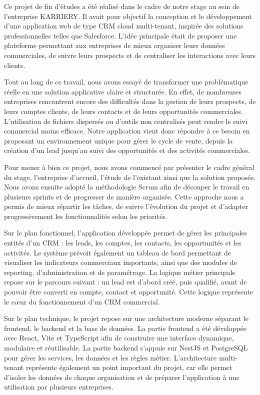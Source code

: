 \documentclass[12pt,a4paper]{report}
\begin{document}
Ce projet de fin d’études a été réalisé dans le cadre de notre stage au sein de l’entreprise KARRIERY. Il avait pour objectif la conception et le développement d’une application web de type CRM cloud multi-tenant, inspirée des solutions professionnelles telles que Salesforce. L’idée principale était de proposer une plateforme permettant aux entreprises de mieux organiser leurs données commerciales, de suivre leurs prospects et de centraliser les interactions avec leurs clients.

Tout au long de ce travail, nous avons essayé de transformer une problématique réelle en une solution applicative claire et structurée. En effet, de nombreuses entreprises rencontrent encore des difficultés dans la gestion de leurs prospects, de leurs comptes clients, de leurs contacts et de leurs opportunités commerciales. L’utilisation de fichiers dispersés ou d’outils non centralisés peut rendre le suivi commercial moins efficace. Notre application vient donc répondre à ce besoin en proposant un environnement unique pour gérer le cycle de vente, depuis la création d’un lead jusqu’au suivi des opportunités et des activités commerciales.

Pour mener à bien ce projet, nous avons commencé par présenter le cadre général du stage, l’entreprise d’accueil, l’étude de l’existant ainsi que la solution proposée. Nous avons ensuite adopté la méthodologie Scrum afin de découper le travail en plusieurs sprints et de progresser de manière organisée. Cette approche nous a permis de mieux répartir les tâches, de suivre l’évolution du projet et d’adapter progressivement les fonctionnalités selon les priorités.

Sur le plan fonctionnel, l’application développée permet de gérer les principales entités d’un CRM : les leads, les comptes, les contacts, les opportunités et les activités. Le système prévoit également un tableau de bord permettant de visualiser les indicateurs commerciaux importants, ainsi que des modules de reporting, d’administration et de paramétrage. La logique métier principale repose sur le parcours suivant : un lead est d’abord créé, puis qualifié, avant de pouvoir être converti en compte, contact et opportunité. Cette logique représente le cœur du fonctionnement d’un CRM commercial.

Sur le plan technique, le projet repose sur une architecture moderne séparant le frontend, le backend et la base de données. La partie frontend a été développée avec React, Vite et TypeScript afin de construire une interface dynamique, modulaire et réutilisable. La partie backend s’appuie sur NestJS et PostgreSQL pour gérer les services, les données et les règles métier. L’architecture multi-tenant représente également un point important du projet, car elle permet d’isoler les données de chaque organisation et de préparer l’application à une utilisation par plusieurs entreprises.
\end{document}
